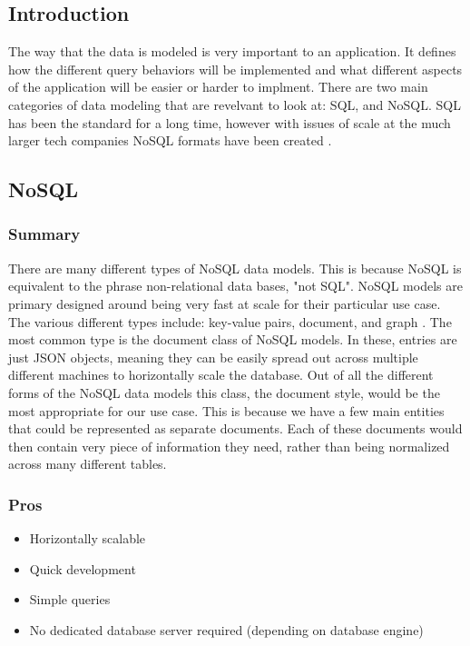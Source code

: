 \documentclass[draftclsnofoot,onecolumn,journal,letterpaper,compsoc,10pt]{IEEEtran}
\begin{document}
    \subsection{Introduction}
    
    The way that the data is modeled is very important to an application.  It defines how the different query behaviors will be implemented and what different aspects of the application will be easier or harder to implment.  There are two main categories of data modeling that are revelvant to look at: SQL, and NoSQL.  SQL has been the standard for a long time, however with issues of scale at the much larger tech companies NoSQL formats have been created \cite{sqlizer}.
    
    \subsection{NoSQL}
    
        \subsubsection{Summary}
        
        There are many different types of NoSQL data models.  This is because NoSQL is equivalent to the phrase non-relational data bases, "not SQL".  NoSQL models are primary designed around being very fast at scale for their particular use case.  The various different types include: key-value pairs, document, and graph \cite{amazon_nosql}.  The most common type is the document class of NoSQL models.  In these, entries are just JSON objects, meaning they can be easily spread out across multiple different machines to horizontally scale the database.  Out of all the different forms of the NoSQL data models this class, the document style, would be the most appropriate for our use case.  This is because we have a few main entities that could be represented as separate documents.  Each of these documents would then contain very piece of information they need, rather than being normalized across many different tables.
        
        \subsubsection{Pros}
        
        \begin{itemize}
            \item Horizontally scalable
            \item Quick development
            \item Simple queries
            \item No dedicated database server required (depending on database engine)
        \end{itemize}
        
\end{document}
